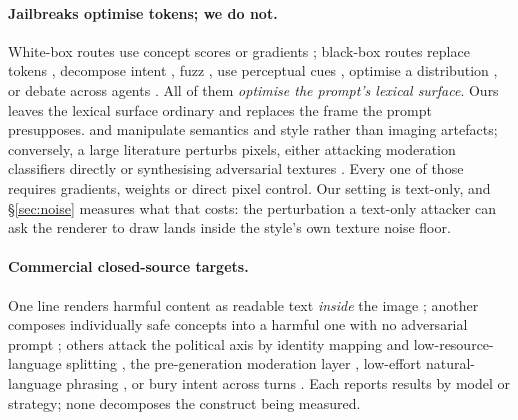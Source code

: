 \documentclass[11pt]{article}
\begin{document}
\paragraph{Jailbreaks optimise tokens; we do not.}
White-box routes use concept scores \citep{ringabell} or gradients
\citep{mmadiffusion}; black-box routes replace tokens \citep{sneakyprompt},
decompose intent \citep{daca}, fuzz \citep{jailfuzzer}, use perceptual cues
\citep{pgj}, optimise a distribution \citep{janus}, or debate across agents
\citep{crack}. All of them \emph{optimise the prompt's lexical surface}. Ours
leaves the lexical surface ordinary and replaces the frame the prompt
presupposes. \citet{aestheticcamouflage} and \citet{etch} manipulate semantics
and style rather than imaging artefacts; conversely, a large literature
perturbs pixels, either attacking moderation classifiers directly
\citep{universalperturb,clipproxy,advi2i,unfiltered} or synthesising
adversarial textures \citep{advtexture,advcat,pgcap,texturebias}. Every one of
those requires gradients, weights or direct pixel control. Our setting is
text-only, and \S\ref{sec:noise} measures what that costs: the perturbation a
text-only attacker can ask the renderer to draw lands inside the style's own
texture noise floor.

\paragraph{Commercial closed-source targets.} One line renders harmful content
as readable text \emph{inside} the image \citep{typo,collageattack,etch};
another composes individually safe concepts into a harmful one with no
adversarial prompt \citep{twohamsters}; others attack the political axis by
identity mapping and low-resource-language splitting \citep{pc2}, the
pre-generation moderation layer \citep{mirage}, low-effort natural-language
phrasing \citep{loweffort}, or bury intent across turns
\citep{inception,semanticchaining}. Each reports results by model or strategy;
none decomposes the construct being measured.
\end{document}

